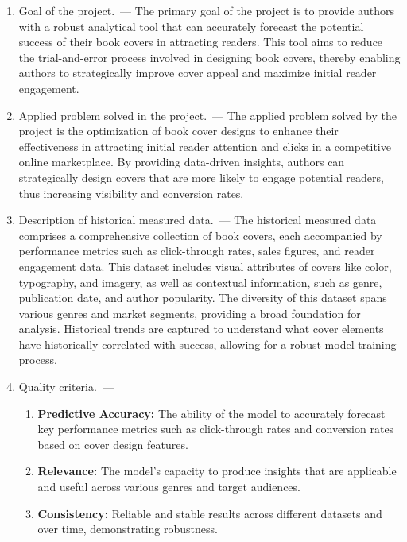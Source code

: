 \documentclass[12pt]{article}
\begin{document}
\begin{enumerate}
\item Goal of the project.~--- The primary goal of the project is to provide authors with a robust analytical tool that can accurately forecast the potential success of their book covers in attracting readers. This tool aims to reduce the trial-and-error process involved in designing book covers, thereby enabling authors to strategically improve cover appeal and maximize initial reader engagement.
\item Applied problem solved in the project.~--- The applied problem solved by the project is the optimization of book cover designs to enhance their effectiveness in attracting initial reader attention and clicks in a competitive online marketplace. By providing data-driven insights, authors can strategically design covers that are more likely to engage potential readers, thus increasing visibility and conversion rates.
\item Description of historical measured data.~--- The historical measured data comprises a comprehensive collection of book covers, each accompanied by performance metrics such as click-through rates, sales figures, and reader engagement data. This dataset includes visual attributes of covers like color, typography, and imagery, as well as contextual information, such as genre, publication date, and author popularity. The diversity of this dataset spans various genres and market segments, providing a broad foundation for analysis. Historical trends are captured to understand what cover elements have historically correlated with success, allowing for a robust model training process.
\item Quality criteria.~--- \begin{enumerate}
                                 \item \textbf{Predictive Accuracy:} The ability of the model to accurately forecast key performance metrics such as click-through rates and conversion rates based on cover design features.

                                 \item \textbf{Relevance:} The model's capacity to produce insights that are applicable and useful across various genres and target audiences.

                                 \item \textbf{Consistency:} Reliable and stable results across different datasets and over time, demonstrating robustness.


\end{enumerate}
\end{enumerate}
\end{document}
